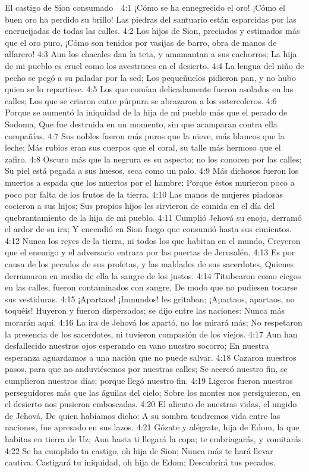El castigo de Sion consumado  

4:1 ¡Cómo se ha ennegrecido el oro!  
¡Cómo el buen oro ha perdido su brillo!  
Las piedras del santuario están esparcidas por las encrucijadas de todas las calles.  
4:2 Los hijos de Sion, preciados y estimados más que el oro puro,  
¡Cómo son tenidos por vasijas de barro, obra de manos de alfarero!  
4:3 Aun los chacales dan la teta, y amamantan a sus cachorros;  
La hija de mi pueblo es cruel como los avestruces en el desierto.  
4:4 La lengua del niño de pecho se pegó a su paladar por la sed;  
Los pequeñuelos pidieron pan, y no hubo quien se lo repartiese.  
4:5 Los que comían delicadamente fueron asolados en las calles;  
Los que se criaron entre púrpura se abrazaron a los estercoleros.  
4:6 Porque se aumentó la iniquidad de la hija de mi pueblo más que el pecado de Sodoma, 
Que fue destruida en un momento, sin que acamparan contra ella compañías.  
4:7 Sus nobles fueron más puros que la nieve, más blancos que la leche;  
Más rubios eran sus cuerpos que el coral, su talle más hermoso que el zafiro.  
4:8 Oscuro más que la negrura es su aspecto; no los conocen por las calles;  
Su piel está pegada a sus huesos, seca como un palo.  
4:9 Más dichosos fueron los muertos a espada que los muertos por el hambre;  
Porque éstos murieron poco a poco por falta de los frutos de la tierra.  
4:10 Las manos de mujeres piadosas cocieron a sus hijos; 
Sus propios hijos les sirvieron de comida en el día del quebrantamiento de la hija de mi pueblo.  
4:11 Cumplió Jehová su enojo, derramó el ardor de su ira;  
Y encendió en Sion fuego que consumió hasta sus cimientos.  
4:12 Nunca los reyes de la tierra, ni todos los que habitan en el mundo,  
Creyeron que el enemigo y el adversario entrara por las puertas de Jerusalén.  
4:13 Es por causa de los pecados de sus profetas, y las maldades de sus sacerdotes,  
Quienes derramaron en medio de ella la sangre de los justos.  
4:14 Titubearon como ciegos en las calles, fueron contaminados con sangre,  
De modo que no pudiesen tocarse sus vestiduras.  
4:15 ¡Apartaos! ¡Inmundos! les gritaban; ¡Apartaos, apartaos, no toquéis!  
Huyeron y fueron dispersados; se dijo entre las naciones:  
Nunca más morarán aquí.  
4:16 La ira de Jehová los apartó, no los mirará más;  
No respetaron la presencia de los sacerdotes, ni tuvieron compasión de los viejos.  
4:17 Aun han desfallecido nuestros ojos esperando en vano nuestro socorro;  
En nuestra esperanza aguardamos a una nación que no puede salvar.  
4:18 Cazaron nuestros pasos, para que no anduviésemos por nuestras calles;  
Se acercó nuestro fin, se cumplieron nuestros días; porque llegó nuestro fin.  
4:19 Ligeros fueron nuestros perseguidores más que las águilas del cielo;  
Sobre los montes nos persiguieron, en el desierto nos pusieron emboscadas.  
4:20 El aliento de nuestras vidas, el ungido de Jehová,  
De quien habíamos dicho: A su sombra tendremos vida entre las naciones, fue apresado en sus lazos.  
4:21 Gózate y alégrate, hija de Edom, la que habitas en tierra de Uz;  
Aun hasta ti llegará la copa; te embriagarás, y vomitarás.  
4:22 Se ha cumplido tu castigo, oh hija de Sion;  
Nunca más te hará llevar cautiva.  
Castigará tu iniquidad, oh hija de Edom;  
Descubrirá tus pecados.  

